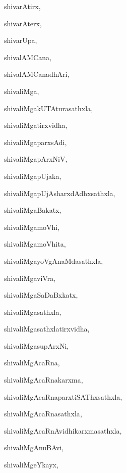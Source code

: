 \begin{multicols}{2}
{shivarAtirx}, \pageref{shivarAtirx}

{shivarAterx}, \pageref{shivarAterx}

{shivarUpa}, \pageref{shivarUpa}

{shivalAMCana}, \pageref{shivalAMCana}

{shivalAMCanadhAri}, \pageref{shivalAMCanadhAri}

{shivaliMga}, \pageref{shivaliMga}

{shivaliMgakUTAturasathxla}, \pageref{shivaliMgakUTAturasathxla}

{shivaliMgatirxvidha}, \pageref{shivaliMgatirxvidha}

{shivaliMgaparxsAdi}, \pageref{shivaliMgaparxsAdi}

{shivaliMgapArxNiV}, \pageref{shivaliMgapArxNiV}

{shivaliMgapUjaka}, \pageref{shivaliMgapUjaka}

{shivaliMgapUjAsharxdAdhxsathxla}, \pageref{shivaliMgapUjAsharxdAdhxsathxla}

{shivaliMgaBakatx}, \pageref{shivaliMgaBakatx}

{shivaliMgamoVhi}, \pageref{shivaliMgamoVhi}

{shivaliMgamoVhita}, \pageref{shivaliMgamoVhita}

{shivaliMgayoVgAnaMdasathxla}, \pageref{shivaliMgayoVgAnaMdasathxla}

{shivaliMgaviVra}, \pageref{shivaliMgaviVra}

{shivaliMgaSaDaBxkatx}, \pageref{shivaliMgaSaDaBxkatx}

{shivaliMgasathxla}, \pageref{shivaliMgasathxla}

{shivaliMgasathxlatirxvidha}, \pageref{shivaliMgasathxlatirxvidha}

{shivaliMgasupArxNi}, \pageref{shivaliMgasupArxNi}

{shivaliMgAcaRna}, \pageref{shivaliMgAcaRna}

{shivaliMgAcaRnakarxma}, \pageref{shivaliMgAcaRnakarxma}

{shivaliMgAcaRnaparxtiSAThxsathxla}, \pageref{shivaliMgAcaRnaparxtiSAThxsathxla}

{shivaliMgAcaRnasathxla}, \pageref{shivaliMgAcaRnasathxla}

{shivaliMgAcaRnAvidhikarxmasathxla}, \pageref{shivaliMgAcaRnAvidhikarxmasathxla}

{shivaliMgAnuBAvi}, \pageref{shivaliMgAnuBAvi}

{shivaliMgeYkayx}, \pageref{shivaliMgeYkayx}


\end{multicols}
